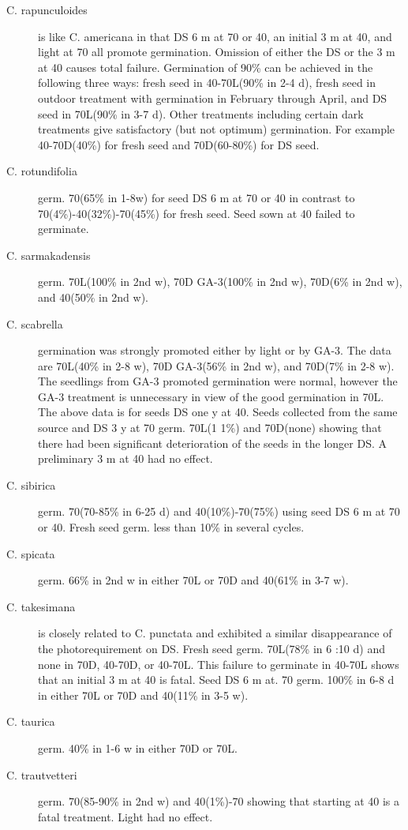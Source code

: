 \begin{description}
\item[C. rapunculoides] is like C. americana in that DS 6 m at 70 or 40, an initial 3 m at
40, and light at 70 all promote germination. Omission of either the DS or the 3 m at 40
causes total failure. Germination of 90\% can be achieved in the following three ways:
fresh seed in 40-70L(90\% in 2-4 d), fresh seed in outdoor treatment with germination
in February through April, and DS seed in 70L(90\% in 3-7 d). Other treatments
including certain dark treatments give satisfactory (but not optimum) germination. For
example 40-70D(40\%) for fresh seed and 70D(60-80\%) for DS seed.
\item[C. rotundifolia] germ. 70(65\% in 1-8w) for seed DS 6 m at 70 or 40 in contrast to
70(4\%)-40(32\%)-70(45\%) for fresh seed. Seed sown at 40 failed to germinate.
\item[C. sarmakadensis] germ. 70L(100\% in 2nd w), 70D GA-3(100\% in 2nd w),
70D(6\% in 2nd w), and 40(50\% in 2nd w).
\item[C. scabrella] germination was strongly promoted either by light or by GA-3. The
data are 70L(40\% in 2-8 w), 70D GA-3(56\% in 2nd w), and 70D(7\% in 2-8 w). The
seedlings from GA-3 promoted germination were normal, however the GA-3 treatment
is unnecessary in view of the good germination in 70L. The above data is for seeds
DS one y at 40. Seeds collected from the same source and DS 3 y at 70 germ.
70L(1 1\%) and 70D(none) showing that there had been significant deterioration of the
seeds in the longer DS. A preliminary 3 m at 40 had no effect.
\item[C. sibirica] germ. 70(70-85\% in 6-25 d) and 40(10\%)-70(75\%) using seed DS 6
m at 70 or 40. Fresh seed germ. less than 10\% in several cycles.
\item[C. spicata] germ. 66\% in 2nd w in either 70L or 70D and 40(61\% in 3-7 w).
\item[C. takesimana] is closely related to C. punctata and exhibited a similar
disappearance of the photorequirement on DS. Fresh seed germ. 70L(78\% in 6 :10 d)
and none in 70D, 40-70D, or 40-70L. This failure to germinate in 40-70L shows that
an initial 3 m at 40 is fatal. Seed DS 6 m at. 70 germ. 100\% in 6-8 d in either 70L or
70D and 40(11\% in 3-5 w).
\item[C. taurica] germ. 40\% in 1-6 w in either 70D or 70L.
\item[C. trautvetteri] germ. 70(85-90\% in 2nd w) and 40(1\%)-70 showing that starting
at 40 is a fatal treatment. Light had no effect.


\end{description}
